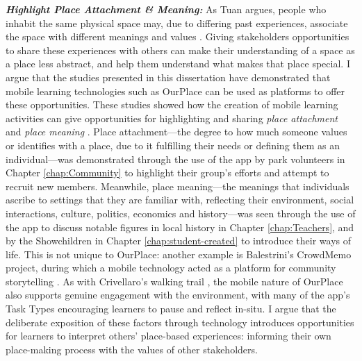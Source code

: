 \textbf{\textit{Highlight Place Attachment \& Meaning:}}  As Tuan argues, people who inhabit the same physical space may, due to differing past experiences, associate the space with different meanings and values \citep{Tuan1978}. Giving stakeholders opportunities to share these experiences with others can make their understanding of a space as a place less abstract, and help them understand what makes that place special. I argue that the studies presented in this dissertation have demonstrated that mobile learning technologies such as OurPlace can be used as platforms to offer these opportunities. These studies showed how the creation of mobile learning activities can give opportunities for highlighting and sharing \textit{place attachment} and \textit{place meaning} \citep{Kudryavtsev2012}. Place attachment---the degree to how much someone values or identifies with a place, due to it fulfilling their needs or defining them as an individual---was demonstrated through the use of the app by park volunteers in Chapter \ref{chap:Community} to highlight their group's efforts and attempt to recruit new members. Meanwhile, place meaning---the meanings that individuals ascribe to settings that they are familiar with, reflecting their environment, social interactions, culture, politics, economics and history---was seen through the use of the app to discuss notable figures in local history in Chapter \ref{chap:Teachers}, and by the Showchildren in Chapter \ref{chap:student-created} to introduce their ways of life. This is not unique to OurPlace: another example is Balestrini's CrowdMemo project, during which a mobile technology acted as a platform for community storytelling \citep{Balestrini2014}. As with Crivellaro's walking trail \citep{Crivellaro2016}, the mobile nature of OurPlace also supports genuine engagement with the environment, with many of the app's Task Types encouraging learners to pause and reflect in-situ. I argue that the deliberate exposition of these factors through technology introduces opportunities for learners to interpret others' place-based experiences: informing their own place-making process with the values of other stakeholders.

